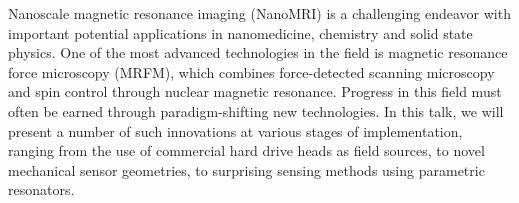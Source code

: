 Nanoscale magnetic resonance imaging (NanoMRI) is a challenging endeavor with important potential applications in nanomedicine, chemistry and solid state physics. One of the most advanced technologies in the field is magnetic resonance force microscopy (MRFM), which combines force-detected scanning microscopy and spin control through nuclear magnetic resonance. Progress in this field must often be earned through paradigm-shifting new technologies. In this talk, we will present a number of such innovations at various stages of implementation, ranging from the use of commercial hard drive heads as field sources, to novel mechanical sensor geometries, to surprising sensing methods using parametric resonators.